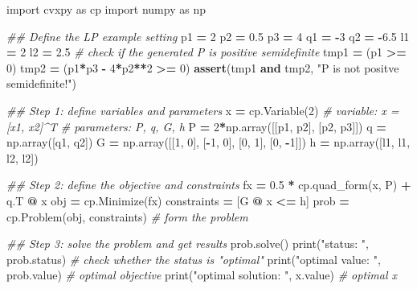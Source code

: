 \documentclass[
]{book}
\newenvironment{Shaded}{\begin{snugshade}}{\end{snugshade}}
\newcommand{\BuiltInTok}[1]{#1}
\newcommand{\CommentTok}[1]{\textcolor[rgb]{0.56,0.35,0.01}{\textit{#1}}}
\newcommand{\ControlFlowTok}[1]{\textcolor[rgb]{0.13,0.29,0.53}{\textbf{#1}}}
\newcommand{\DecValTok}[1]{\textcolor[rgb]{0.00,0.00,0.81}{#1}}
\newcommand{\FloatTok}[1]{\textcolor[rgb]{0.00,0.00,0.81}{#1}}
\newcommand{\ImportTok}[1]{#1}
\newcommand{\KeywordTok}[1]{\textcolor[rgb]{0.13,0.29,0.53}{\textbf{#1}}}
\newcommand{\NormalTok}[1]{#1}
\newcommand{\OperatorTok}[1]{\textcolor[rgb]{0.81,0.36,0.00}{\textbf{#1}}}
\newcommand{\StringTok}[1]{\textcolor[rgb]{0.31,0.60,0.02}{#1}}
\theoremstyle{definition}
\theoremstyle{definition}
\theoremstyle{definition}
\theoremstyle{definition}
\theoremstyle{remark}
\begin{document}
\begin{Shaded}
\begin{Highlighting}[]
\ImportTok{import}\NormalTok{ cvxpy }\ImportTok{as}\NormalTok{ cp}
\ImportTok{import}\NormalTok{ numpy }\ImportTok{as}\NormalTok{ np}

\CommentTok{\#\# Define the LP example setting}
\NormalTok{p1 }\OperatorTok{=} \DecValTok{2}
\NormalTok{p2 }\OperatorTok{=} \FloatTok{0.5}
\NormalTok{p3 }\OperatorTok{=} \DecValTok{4}
\NormalTok{q1 }\OperatorTok{=} \OperatorTok{{-}}\DecValTok{3}
\NormalTok{q2 }\OperatorTok{=} \OperatorTok{{-}}\FloatTok{6.5}
\NormalTok{l1 }\OperatorTok{=} \DecValTok{2}
\NormalTok{l2 }\OperatorTok{=} \FloatTok{2.5}
\CommentTok{\# check if the generated P is positive semidefinite}
\NormalTok{tmp1 }\OperatorTok{=}\NormalTok{ (p1 }\OperatorTok{\textgreater{}=} \DecValTok{0}\NormalTok{)}
\NormalTok{tmp2 }\OperatorTok{=}\NormalTok{ (p1}\OperatorTok{*}\NormalTok{p3 }\OperatorTok{{-}} \DecValTok{4}\OperatorTok{*}\NormalTok{p2}\OperatorTok{**}\DecValTok{2} \OperatorTok{\textgreater{}=} \DecValTok{0}\NormalTok{)}
\ControlFlowTok{assert}\NormalTok{(tmp1 }\KeywordTok{and}\NormalTok{ tmp2, }\StringTok{"P is not positve semidefinite!"}\NormalTok{)}

\CommentTok{\#\# Step 1: define variables and parameters}
\NormalTok{x }\OperatorTok{=}\NormalTok{ cp.Variable(}\DecValTok{2}\NormalTok{) }\CommentTok{\# variable: x = [x1, x2]\^{}T}
\CommentTok{\# parameters: P, q, G, h}
\NormalTok{P }\OperatorTok{=} \DecValTok{2}\OperatorTok{*}\NormalTok{np.array([[p1, p2], [p2, p3]])}
\NormalTok{q }\OperatorTok{=}\NormalTok{ np.array([q1, q2]) }
\NormalTok{G }\OperatorTok{=}\NormalTok{ np.array([[}\DecValTok{1}\NormalTok{, }\DecValTok{0}\NormalTok{], [}\OperatorTok{{-}}\DecValTok{1}\NormalTok{, }\DecValTok{0}\NormalTok{], [}\DecValTok{0}\NormalTok{, }\DecValTok{1}\NormalTok{], [}\DecValTok{0}\NormalTok{, }\OperatorTok{{-}}\DecValTok{1}\NormalTok{]])}
\NormalTok{h }\OperatorTok{=}\NormalTok{ np.array([l1, l1, l2, l2])}

\CommentTok{\#\# Step 2: define the objective and constraints}
\NormalTok{fx }\OperatorTok{=} \FloatTok{0.5} \OperatorTok{*}\NormalTok{ cp.quad\_form(x, P) }\OperatorTok{+}\NormalTok{ q.T }\OperatorTok{@}\NormalTok{ x}
\NormalTok{obj }\OperatorTok{=}\NormalTok{ cp.Minimize(fx)}
\NormalTok{constraints }\OperatorTok{=}\NormalTok{ [G }\OperatorTok{@}\NormalTok{ x }\OperatorTok{\textless{}=}\NormalTok{ h]}
\NormalTok{prob }\OperatorTok{=}\NormalTok{ cp.Problem(obj, constraints) }\CommentTok{\# form the problem}

\CommentTok{\#\# Step 3: solve the problem and get results}
\NormalTok{prob.solve()  }
\BuiltInTok{print}\NormalTok{(}\StringTok{"status: "}\NormalTok{, prob.status) }\CommentTok{\# check whether the status is "optimal"}
\BuiltInTok{print}\NormalTok{(}\StringTok{"optimal value: "}\NormalTok{, prob.value) }\CommentTok{\# optimal objective}
\BuiltInTok{print}\NormalTok{(}\StringTok{"optimal solution: "}\NormalTok{, x.value) }\CommentTok{\# optimal x}
\end{Highlighting}
\end{Shaded}
\end{document}
